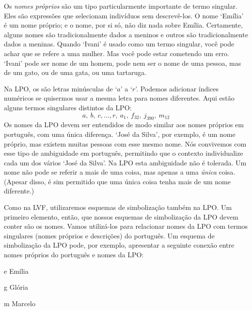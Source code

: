 Os \emph{nomes próprios} são um tipo particularmente importante de termo singular.
Eles são expressões que selecionam indivíduos sem descrevê-los.
O nome `Emília' é um nome próprio; e o nome, por si só, não diz nada sobre Emília.
Certamente, alguns nomes são tradicionalmente dados a meninos e outros são tradicionalmente dados a meninas.
Quando `Ivani' é usado como um termo singular, você pode achar que se refere a uma mulher.
Mas você pode estar cometendo um erro.
`Ivani' pode ser nome de um homem, pode nem ser o nome de uma pessoa, mas de um gato, ou de uma gata, ou uma tartaruga.

Na LPO, os  são letras minúsculas de `$a$' a `$r$'.
Podemos adicionar índices numéricos se quisermos usar a mesma letra para nomes diferentes.
Aqui estão alguns termos singulares distintos da LPO:
	$$a,\ b,\ c,\ldots, r, \ a_1, \ f_{32}, \ j_{390}, \ m_{12}$$
Os nomes da LPO devem ser entendidos de modo similar aos nomes próprios em português, com uma única diferença.
`José da Silva', por exemplo, é um nome próprio, mas existem muitas pessoas com esse mesmo nome.
Nós convivemos com esse tipo de ambiguidade em português, permitindo que o contexto individualize cada um dos vários `José da Silva'.
Na LPO esta ambiguidade não é tolerada.
Um nome não pode se referir a mais de uma coisa, mas apenas a uma \emph{única} coisa.
(Apesar disso, é sim permitido que uma única coisa tenha mais de um nome diferente.)

Como na LVF, utilizaremos esquemas de simbolização também na LPO.
Um primeiro elemento, então, que nossos esquemas de simbolização da LPO devem conter são os nomes.
Vamos utilizá-los para relacionar nomes da LPO com termos singulares (nomes próprios e descrições) do português.
Um esquema de simbolização da LPO pode, por exemplo, apresentar a seguinte conexão entre nomes próprios do português e nomes da LPO:
	\begin{ekey}
		\item[e] Emília
		\item[g] Glória
		\item[m] Marcelo
	\end{ekey}


